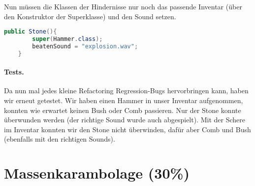 \documentclass{pi1}
\begin{document}
Nun müssen die Klassen der Hindernisse nur noch das passende Inventar (über den Konstruktor der Superklasse) und den Sound setzen.

\begin{lstlisting}[caption={Konstruktor von \emph{Stone}}, firstnumber=18, language=Java]
public Stone(){
        super(Hammer.class);
        beatenSound = "explosion.wav";
    }
\end{lstlisting}

\paragraph{Tests.}Da nun mal jedes kleine Refactoring Regression-Bugs hervorbringen kann, haben wir erneut getestet. Wir haben einen Hammer in unser Inventar aufgenommen, konnten wie erwartet keinen Bush oder Comb passieren. Nur der Stone konnte überwunden werden (der richtige Sound wurde auch abgespielt). Mit der Schere im Inventar konnten wir den Stone nicht überwinden, dafür aber Comb und Bush (ebenfalls mit den richtigen Sounds).

\section{Massenkarambolage (30\%)}
\label{s:collider}
\end{document}
